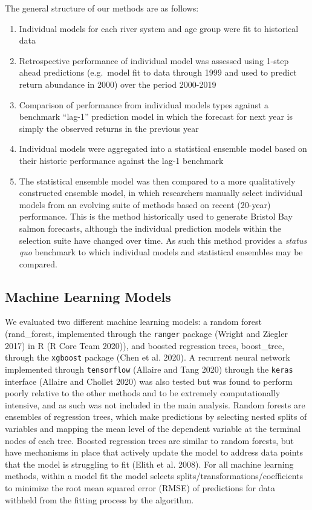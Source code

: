 \documentclass[
]{article}
\begin{document}
The general structure of our methods are as follows:

\begin{enumerate}
\def\labelenumi{\arabic{enumi}.}
\item
  Individual models for each river system and age group were fit to historical data
\item
  Retrospective performance of individual model was assessed using 1-step ahead predictions (e.g.~model fit to data through 1999 and used to predict return abundance in 2000) over the period 2000-2019
\item
  Comparison of performance from individual models types against a benchmark ``lag-1'' prediction model in which the forecast for next year is simply the observed returns in the previous year
\item
  Individual models were aggregated into a statistical ensemble model based on their historic performance against the lag-1 benchmark
\item
  The statistical ensemble model was then compared to a more qualitatively constructed ensemble model, in which researchers manually select individual models from an evolving suite of methods based on recent (20-year) performance. This is the method historically used to generate Bristol Bay salmon forecasts, although the individual prediction models within the selection suite have changed over time. As such this method provides a \emph{status quo} benchmark to which individual models and statistical ensembles may be compared.
\end{enumerate}

\hypertarget{machine-learning-models}{%
\subsection*{Machine Learning Models}\label{machine-learning-models}}

We evaluated two different machine learning models: a random forest (rand\_forest, implemented through the \texttt{ranger} package (Wright and Ziegler 2017) in R (R Core Team 2020)), and boosted regression trees, boost\_tree, through the \texttt{xgboost} package (Chen et al. 2020). A recurrent neural network implemented through \texttt{tensorflow} (Allaire and Tang 2020) through the \texttt{keras} interface (Allaire and Chollet 2020) was also tested but was found to perform poorly relative to the other methods and to be extremely computationally intensive, and as such was not included in the main analysis. Random forests are ensembles of regression trees, which make predictions by selecting nested splits of variables and mapping the mean level of the dependent variable at the terminal nodes of each tree. Boosted regression trees are similar to random forests, but have mechanisms in place that actively update the model to address data points that the model is struggling to fit (Elith et al. 2008). For all machine learning methods, within a model fit the model selects splits/transformations/coefficients to minimize the root mean squared error (RMSE) of predictions for data withheld from the fitting process by the algorithm.
\end{document}
